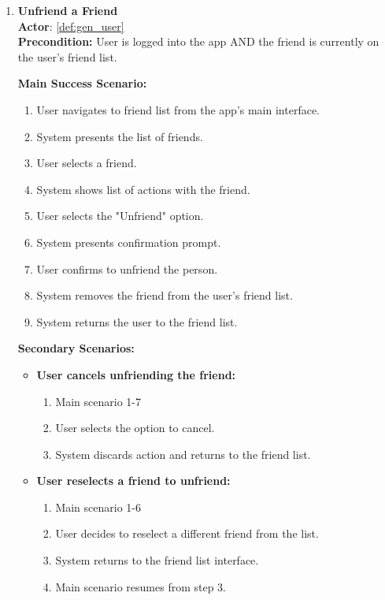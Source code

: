 \documentclass{article}
\begin{document}
\begin{enumerate}[label=\textbf{UC\arabic*}]
    \item \label{uc:28} \textbf{Unfriend a Friend} \\
          \textbf{Actor}: \ref{def:gen_user} \\
          \textbf{Precondition:} User is logged into the app AND the friend is currently on the user's friend list.

          \textbf{Main Success Scenario:}
          \begin{enumerate}[label=\textbf{\arabic*.}]
              \item User navigates to friend list from the app’s main interface.
              \item System presents the list of friends.
              \item User selects a friend.
              \item System shows list of actions with the friend.
              \item User selects the "Unfriend" option.
              \item System presents confirmation prompt.
              \item User confirms to unfriend the person.
              \item System removes the friend from the user’s friend list.
              \item System returns the user to the friend list.
          \end{enumerate}

          \textbf{Secondary Scenarios:}
          \begin{itemize}
              \item[{}] \textbf{User cancels unfriending the friend:}
                    \begin{enumerate}[label=\textbf{\arabic*.}]
                        \item Main scenario 1-7
                        \item User selects the option to cancel.
                        \item System discards action and returns to the friend list.
                    \end{enumerate}

              \item[{}] \textbf{User reselects a friend to unfriend:}
                    \begin{enumerate}[label=\textbf{\arabic*.}]
                        \item Main scenario 1-6
                        \item User decides to reselect a different friend from the list.
                        \item System returns to the friend list interface.
                        \item Main scenario resumes from step 3.
                    \end{enumerate}
          \end{itemize}


\end{enumerate}
\end{document}
